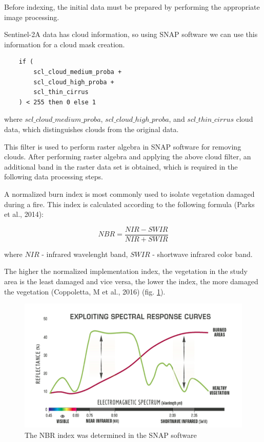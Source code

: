 	Before indexing, the initial data must be prepared by performing the appropriate image processing.
	
	Sentinel-2A data has cloud information, so using SNAP software we can use this information for a cloud mask creation.
	
	\begin{lstlisting}
	if (
		scl_cloud_medium_proba + 
		scl_cloud_high_proba +                                                			      
		scl_thin_cirrus
	) < 255 then 0 else 1
	\end{lstlisting}
	
	where $scl\_cloud\_medium\_proba$, $scl\_cloud\_high\_proba$, and $scl\_thin\_cirrus$ cloud data, which distinguishes clouds from the original data.
	
	This filter is used to perform raster algebra in SNAP software for removing clouds. After performing raster algebra and applying the above cloud filter, an additional band in the raster data set is obtained, which is required in the following data processing steps.
	
	A normalized burn index is most commonly used to isolate vegetation damaged during a fire. This index is calculated according to the following formula (Parks et al., 2014):
	
	\begin{equation}
	NBR=\dfrac{NIR - SWIR}{NIR + SWIR}
	\end{equation}
	
	where $NIR$ - infrared wavelenght band, $SWIR$ - shortwave infrared color band.
	
	The higher the normalized implementation index, the vegetation in the study area is the least damaged and vice versa, the lower the index, the more damaged the vegetation (Coppoletta, M et al., 2016) (fig. \ref{fig:nbr_index}).
	
	\begin{figure}[H]
		\centering
		\includegraphics[width=0.9\linewidth]{images/nbr_index.png}
		\caption{The NBR index was determined in the SNAP software}
		\label{fig:nbr_index}
	\end{figure}

